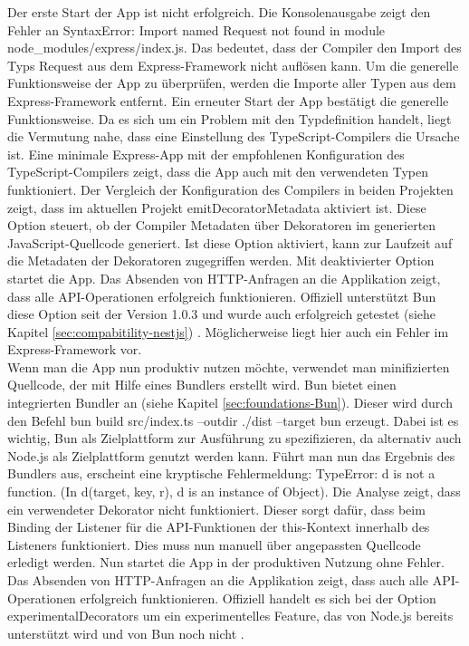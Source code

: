 \noindent
Der erste Start der App ist nicht erfolgreich. Die Konsolenausgabe zeigt den Fehler an \glqq SyntaxError: Import named Request not found in module node\_modules/express/index.js\grqq{}. Das bedeutet, dass der Compiler den Import des Typs \glqq Request\grqq{} aus dem Express-Framework nicht auflösen kann. Um die generelle Funktionsweise der App zu überprüfen, werden die Importe aller Typen aus dem Express-Framework entfernt. Ein erneuter Start der App bestätigt die generelle Funktionsweise. Da es sich um ein Problem mit den Typdefinition handelt, liegt die Vermutung nahe, dass eine Einstellung des TypeScript-Compilers die Ursache ist. Eine minimale Express-App mit der empfohlenen Konfiguration des TypeScript-Compilers zeigt, dass die App auch mit den verwendeten Typen funktioniert. Der Vergleich der Konfiguration des Compilers in beiden Projekten zeigt, dass im aktuellen Projekt \glqq emitDecoratorMetadata\grqq{} aktiviert ist. Diese Option steuert, ob der Compiler Metadaten über Dekoratoren im generierten JavaScript-Quellcode generiert. Ist diese Option aktiviert, kann zur Laufzeit auf die Metadaten der Dekoratoren zugegriffen werden. Mit deaktivierter Option startet die App. Das Absenden von HTTP-Anfragen an die Applikation zeigt, dass alle API-Operationen erfolgreich funktionieren. Offiziell unterstützt Bun diese Option seit der Version 1.0.3 und wurde auch erfolgreich getestet (siehe Kapitel \ref{sec:compabitility-nestjs}) \cite{McDonnel.2023}. Möglicherweise liegt hier auch ein Fehler im Express-Framework vor.\\

\noindent
Wenn man die App nun produktiv nutzen möchte, verwendet man minifizierten Quellcode, der mit Hilfe eines Bundlers erstellt wird. Bun bietet einen integrierten Bundler an (siehe Kapitel \ref{sec:foundations-Bun}). Dieser wird durch den Befehl \glqq bun build src/index.ts --outdir ./dist --target bun\grqq{} erzeugt. Dabei ist es wichtig, Bun als Zielplattform zur Ausführung zu spezifizieren, da alternativ auch Node.js als Zielplattform genutzt werden kann. Führt man nun das Ergebnis des Bundlers aus, erscheint eine kryptische Fehlermeldung: \glqq TypeError: d is not a function. (In d(target, key, r), d is an instance of Object)\grqq{}. Die Analyse zeigt, dass ein verwendeter Dekorator nicht funktioniert. Dieser sorgt dafür, dass beim Binding der Listener für die API-Funktionen  der this-Kontext innerhalb des Listeners funktioniert. Dies muss nun manuell über angepassten Quellcode erledigt werden. Nun startet die App in der produktiven Nutzung ohne Fehler. Das Absenden von HTTP-Anfragen an die Applikation zeigt, dass auch alle API-Operationen erfolgreich funktionieren. Offiziell handelt es sich bei der Option \glqq experimentalDecorators\grqq{} um ein experimentelles Feature, das von Node.js bereits unterstützt wird und von Bun noch nicht \cite{Microsoft.2023}.

